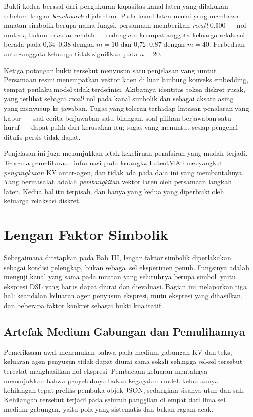 Bukti kedua berasal dari pengukuran kapasitas kanal laten yang dilakukan
sebelum lengan \textit{benchmark} dijalankan. Pada kanal laten murni yang
membawa muatan simbolik berupa nama fungsi, persamaan  memberikan
\textit{recall} 0,000 --- nol mutlak, bukan sekadar rendah --- sedangkan
keempat anggota keluarga relaksasi berada pada 0,34--0,38 dengan $m=10$ dan
0,72--0,87 dengan $m=40$. Perbedaan antar-anggota keluarga tidak signifikan
pada $n=20$.

Ketiga potongan bukti tersebut menyusun satu penjelasan yang runtut. Persamaan
resmi menempatkan vektor laten di luar lambung konveks embedding, tempat
perilaku model tidak terdefinisi. Akibatnya identitas token diskret rusak, yang
terlihat sebagai \textit{recall} nol pada kanal simbolik dan sebagai aksara
asing yang menyusup ke jawaban. Tugas yang toleran terhadap lintasan penalaran
yang kabur --- soal cerita berjawaban satu bilangan, soal pilihan berjawaban
satu huruf --- dapat pulih dari kerusakan itu; tugas yang menuntut setiap
pengenal ditulis persis tidak dapat.

Penjelasan ini juga menunjukkan letak kekeliruan penafsiran yang mudah terjadi.
Teorema pemeliharaan informasi pada kerangka LatentMAS menyangkut
\textit{pengangkutan} KV antar-agen, dan tidak ada pada data ini yang
membantahnya. Yang bermasalah adalah \textit{pembangkitan} vektor laten oleh
persamaan langkah laten. Kedua hal itu terpisah, dan hanya yang kedua yang
diperbaiki oleh keluarga relaksasi diskret.

\section{Lengan Faktor Simbolik}
\label{sec:faktor}

Sebagaimana ditetapkan pada Bab~III, lengan faktor simbolik diperlakukan
sebagai kondisi pelengkap, bukan sebagai sel eksperimen penuh. Fungsinya adalah
menguji kanal yang sama pada muatan yang seluruhnya berupa simbol, yaitu
ekspresi DSL yang harus dapat diurai dan dievaluasi. Bagian ini melaporkan tiga
hal: keandalan keluaran agen penyusun ekspresi, mutu ekspresi yang dihasilkan,
dan beberapa faktor konkret sebagai bukti kualitatif.

\subsection{Artefak Medium Gabungan dan Pemulihannya}

Pemeriksaan awal menemukan bahwa pada medium gabungan KV dan teks, keluaran
agen penyusun tidak dapat diurai sama sekali sehingga sel-sel tersebut
tercatat menghasilkan nol ekspresi. Pembacaan keluaran mentahnya menunjukkan
bahwa penyebabnya bukan kegagalan model: keluarannya kehilangan tepat prefiks
pembuka objek JSON, sedangkan sisanya utuh dan sah. Kehilangan tersebut terjadi
pada seluruh panggilan di empat dari lima sel medium gabungan, yaitu pola yang
sistematis dan bukan ragam acak.

